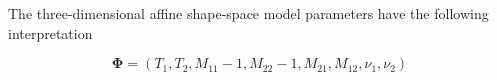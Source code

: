 The three-dimensional affine shape-space model parameters have
the following interpretation

\begin{equation}
  \label{eq:4.19}
  \mathbf{\Phi} =  (T_1, T_2, M_{11} - 1, M_{22} - 1, M_{21}, M_{12}, \nu_1, \nu_2)
\end{equation}

\begin{figure}[htbp] 
  \begin{minipage}[t]{0.5\linewidth} 
    \centering 
  \end{minipage}%
  \begin{minipage}[t]{0.5\linewidth} 
    \centering 
  \end{minipage} 
  \begin{minipage}[t]{0.5\linewidth} 
    \centering 
  \end{minipage} 

\end{figure}
